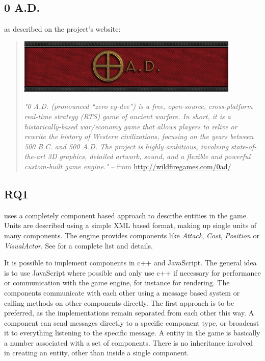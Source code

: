 \subsection{0 A.D.}

\AD{} as described on the project's website:
\begin{quote}
\begin{center}\includegraphics[scale=0.8]{pics/0ad}\end{center}
\textit{"0 A.D. (pronounced “zero ey-dee”) is a free, open-source, cross-platform real-time strategy (RTS) game of
ancient warfare. In short, it is a historically-based war/economy game that allows players to relive or rewrite the
history of Western civilizations, focusing on the years between 500 B.C. and 500 A.D. The project is highly ambitious,
involving state-of-the-art 3D graphics, detailed artwork, sound, and a flexible and powerful custom-built game engine."}
-- from \url{http://wildfiregames.com/0ad/}
\end{quote}

\subsection{RQ1}
\AD{} uses a completely component based approach to describe entities in the game. Units are described using a simple
XML based format, making up single units of many components. The engine provides components like \textit{Attack},
\textit{Cost}, \textit{Position} or \textit{VisualActor}. See \citet[Entity Component Documenation]{0adcomponents} for a
complete list and details. 

It is possible to implement components in c++ and JavaScript. The general idea is to use
JavaScript where possible and only use c++ if necessary for performance or communication with the game engine, for
instance for rendering. The components communicate with each other using a message based system or calling methods on
other components directly. The first approach is to be preferred, as the implementations remain separated from each other
this way. A component can send messages directly to a specific component type, or broadcast it to everything listening to
the specific message. A entity in the game is basically a number associated with a set of components. There is no
inheritance involved in creating an entity, other than inside a single component.

